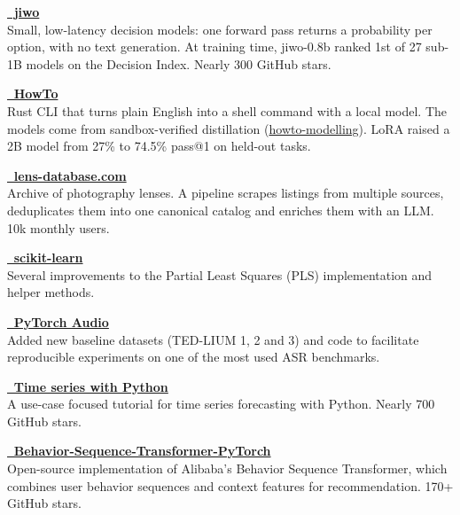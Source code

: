 
{\textbf{\href{https://github.com/jiwidi/jiwo}{\faGithub \, jiwo }}} \\ 
Small, low-latency decision models: one forward pass returns a probability per option, with no text generation. At training time, jiwo-0.8b ranked 1st of 27 sub-1B models on the Decision Index. Nearly 300 GitHub stars.

{\textbf{\href{https://github.com/jiwidi/howto}{\faGithub \, HowTo }}} \\ 
Rust CLI that turns plain English into a shell command with a local model. The models come from sandbox-verified distillation (\href{https://github.com/jiwidi/howto-modelling}{howto-modelling}). LoRA raised a 2B model from 27\% to 74.5\% pass@1 on held-out tasks.

{\textbf{\href{https://lens-database.com}{\faGlobe \, lens-database.com}}} \\ 
Archive of photography lenses. A pipeline scrapes listings from multiple sources, deduplicates them into one canonical catalog and enriches them with an LLM. 10k monthly users.

{\textbf{\href{https://github.com/scikit-learn/scikit-learn}{\faGithub \, scikit-learn }}} \\ Several improvements to the Partial Least Squares (PLS) implementation and helper methods. 

{\textbf{\href{https://github.com/pytorch/audio}{\faGithub \, PyTorch Audio }}} \\ Added new baseline datasets (TED-LIUM 1, 2 and 3) and code to facilitate reproducible experiments on one of the most used ASR benchmarks. 

{\textbf{\href{https://github.com/jiwidi/time-series-forecasting-with-python}{\faGithub \,  Time series with Python  }}} \\ 
A use-case focused tutorial for time series forecasting with Python. Nearly 700 GitHub stars.

{\textbf{\href{https://github.com/jiwidi/Behavior-Sequence-Transformer-Pytorch}{\faGithub \, Behavior-Sequence-Transformer-PyTorch }}} \\ 
Open-source implementation of Alibaba's Behavior Sequence Transformer, which combines user behavior sequences and context features for recommendation. 170+ GitHub stars.

